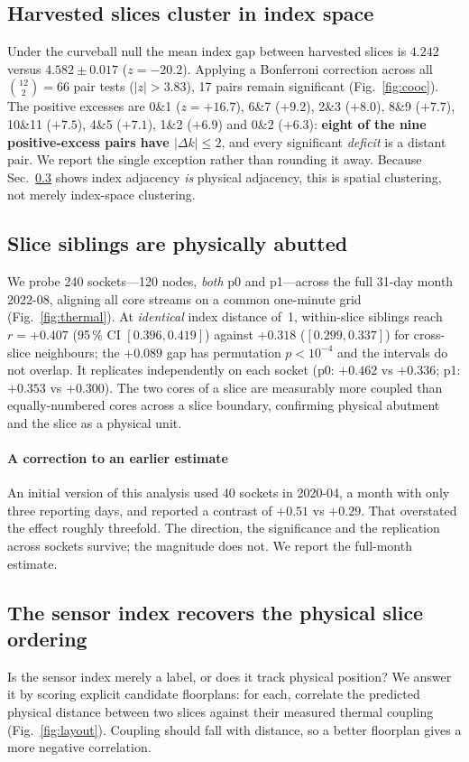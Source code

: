 \documentclass[10pt,conference]{IEEEtran}
\begin{document}
\subsection{Harvested slices cluster in index space}
\label{sec:cluster}
Under the curveball null the mean index gap between harvested slices is $4.242$ versus
$4.582\pm0.017$ ($z=-20.2$). Applying a Bonferroni correction across all $\binom{12}{2}=66$ pair
tests ($|z|>3.83$), 17 pairs remain significant (Fig.~\ref{fig:cooc}). The positive excesses are
0\&1 ($z=+16.7$), 6\&7 ($+9.2$), 2\&3 ($+8.0$), 8\&9 ($+7.7$), 10\&11 ($+7.5$), 4\&5 ($+7.1$),
1\&2 ($+6.9$) and 0\&2 ($+6.3$): \textbf{eight of the nine positive-excess pairs have
$|\Delta k|\le2$}, and every significant \emph{deficit} is a distant pair. We report the single
exception rather than rounding it away. Because Sec.~\ref{sec:layout} shows index adjacency
\emph{is} physical adjacency, this is spatial clustering, not merely index-space clustering.

\subsection{Slice siblings are physically abutted}
We probe 240 sockets---120 nodes, \emph{both} p0 and p1---across the full 31-day month 2022-08,
aligning all core streams on a common one-minute grid (Fig.~\ref{fig:thermal}). At
\emph{identical} index distance of~1, within-slice siblings reach $r=+0.407$
(95\,\% CI $[0.396,0.419]$) against $+0.318$ ($[0.299,0.337]$) for cross-slice neighbours;
the $+0.089$ gap has permutation $p<10^{-4}$ and the intervals do not overlap. It replicates
independently on each socket (p0: $+0.462$ vs $+0.336$; p1: $+0.353$ vs $+0.300$). The two cores of
a slice are measurably more coupled than equally-numbered cores across a slice boundary, confirming
physical abutment and the slice as a physical unit.

\paragraph*{A correction to an earlier estimate} An initial version of this analysis used 40
sockets in 2020-04, a month with only three reporting days, and reported a contrast of
$+0.51$ vs $+0.29$. That overstated the effect roughly threefold. The direction, the significance
and the replication across sockets survive; the magnitude does not. We report the full-month
estimate.

\subsection{The sensor index recovers the physical slice ordering}
\label{sec:layout}
Is the sensor index merely a label, or does it track physical position? We answer it by scoring
explicit candidate floorplans: for each, correlate the predicted physical distance between two
slices against their measured thermal coupling (Fig.~\ref{fig:layout}). Coupling should fall with
distance, so a better floorplan gives a more negative correlation.
\end{document}
